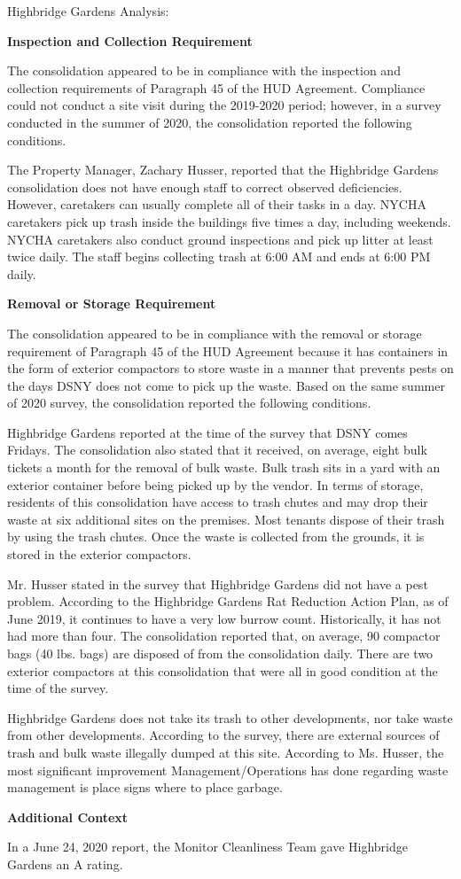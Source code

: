 Highbridge Gardens Analysis: 

\textbf{Inspection and Collection Requirement} 

 

The consolidation appeared to be in compliance with the inspection and collection requirements of Paragraph 45 of the HUD Agreement. Compliance could not conduct a site visit during the 2019-2020 period; however, in a survey conducted in the summer of 2020, the consolidation reported the following conditions. 

The Property Manager, Zachary Husser, reported that the Highbridge Gardens consolidation does not have enough staff to correct observed deficiencies. However, caretakers can usually complete all of their tasks in a day. NYCHA caretakers pick up trash inside the buildings five times a day, including weekends. NYCHA caretakers also conduct ground inspections and pick up litter at least twice daily. The staff begins collecting trash at 6:00 AM and ends at 6:00 PM daily. 

\textbf{Removal or Storage Requirement} 

The consolidation appeared to be in compliance with the removal or storage requirement of Paragraph  45 of the HUD Agreement because it has containers in the form of exterior compactors to store waste in a manner that prevents pests on the days DSNY does not come to pick up the waste. Based on the same summer of  2020 survey, the consolidation reported the following conditions.

Highbridge Gardens reported at the time of the survey that DSNY comes Fridays. The consolidation also stated that it received, on average, eight bulk tickets a month for the removal of bulk waste. Bulk trash sits in a yard with an exterior container before being picked up by the vendor. In terms of storage, residents of this consolidation have access to trash chutes and may drop their waste at six additional sites on the premises. Most tenants dispose of their trash by using the trash chutes. Once the waste is collected from the grounds, it is stored in the exterior compactors.  

 

Mr. Husser stated in the survey that Highbridge Gardens did not have a pest problem. According to the Highbridge Gardens Rat Reduction Action Plan, as of June 2019, it continues to have a very low burrow count. Historically, it has not had more than four. The consolidation reported that, on average, 90 compactor bags (40 lbs. bags)  are disposed of from the consolidation daily. There are two exterior compactors at this consolidation that were all in good condition at the time of the survey. 

Highbridge Gardens does not take its trash to other developments, nor take waste from other developments. According to the survey, there are external sources of trash and bulk waste illegally dumped at this site. According to Ms. Husser, the most significant improvement Management/Operations has done regarding waste management is place signs where to place garbage.

\textbf{Additional Context}  

In a June 24, 2020 report, the Monitor Cleanliness Team gave Highbridge Gardens an A rating.  
